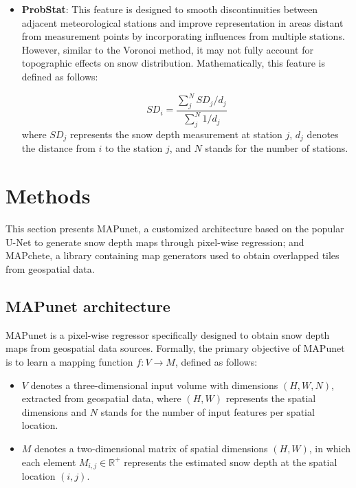 \documentclass[preprint,12pt]{elsarticle}
\begin{document}
\begin{itemize}
    This approach is particularly effective for preserving measured values at station locations and establishing clear boundaries of influence for each station. However, it can result in abrupt transitions at regional boundaries and may not fully capture the impact of topography on snow distribution. 
    
    \item \textbf{ProbStat}: This feature is designed to smooth discontinuities between adjacent meteorological stations and improve representation in areas distant from measurement points by incorporating influences from multiple stations. However, similar to the Voronoi method, it may not fully account for topographic effects on snow distribution. Mathematically, this feature is defined as follows:

    \begin{equation}
            \text{$SD_{i}$} = \frac{\sum_j^N SD_j/d_j}{\sum_j^N 1/d_j}
    \end{equation}
    \noindent where $SD_j$ represents the snow depth measurement at station $j$, $d_j$ denotes the distance from $i$ to the station $j$, and $N$ stands for the number of stations.
\end{itemize}

\section{Methods}
\label{Sec:Methodology}

This section presents MAPunet, a customized architecture based on the popular U-Net to generate snow depth maps through pixel-wise regression; and MAPchete, a library containing map generators used to obtain overlapped tiles from geospatial data.

\subsection{MAPunet architecture}

MAPunet is a pixel-wise regressor specifically designed to obtain snow depth maps from geospatial data sources. Formally, the primary objective of MAPunet is to learn a mapping function $f: V \rightarrow M$, defined as follows:

\begin{itemize}
    \item $V$ denotes a three-dimensional input volume with dimensions $(H, W, N)$, extracted from geospatial data, where $(H, W)$ represents the spatial dimensions and $N$ stands for the number of input features per spatial location.
    \item $M$ denotes a two-dimensional matrix of spatial dimensions $(H, W)$, in which each element $M_{i,j} \in \mathbb{R}^+$ represents the estimated snow depth at the spatial location $(i, j)$.
\end{itemize}
\end{document}
